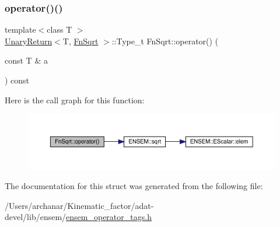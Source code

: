 \subsubsection{\texorpdfstring{operator()()}{operator()()}\hspace{0.1cm}{\footnotesize\ttfamily [3/3]}}
{\footnotesize\ttfamily template$<$class T $>$ \\
\mbox{\hyperlink{structUnaryReturn}{Unary\+Return}}$<$T, \mbox{\hyperlink{structFnSqrt}{Fn\+Sqrt}} $>$\+::Type\+\_\+t Fn\+Sqrt\+::operator() (\begin{DoxyParamCaption}\item[{const T \&}]{a }\end{DoxyParamCaption}) const\hspace{0.3cm}{\ttfamily [inline]}}

Here is the call graph for this function\+:
\nopagebreak
\begin{figure}[H]
\begin{center}
\leavevmode
\includegraphics[width=350pt]{d0/d4d/structFnSqrt_a019bed3e40dc318937e7655b3e4222bb_cgraph}
\end{center}
\end{figure}


The documentation for this struct was generated from the following file\+:\begin{DoxyCompactItemize}
\item 
/\+Users/archanar/\+Kinematic\+\_\+factor/adat-\/devel/lib/ensem/\mbox{\hyperlink{adat-devel_2lib_2ensem_2ensem__operator__tags_8h}{ensem\+\_\+operator\+\_\+tags.\+h}}\end{DoxyCompactItemize}
